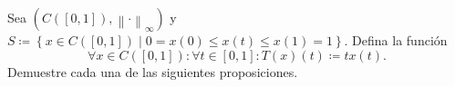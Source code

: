       Sea
      \begin{math}
        \left(
          C\left(\left[0,1\right]\right),
          {\left\|\cdot\right\|}_{\infty}
        \right)
      \end{math}
      y
      \begin{math}
        S\coloneqq
        \left\{x\in C\left(\left[0,1\right]\right)\mid
          0=x\left(0\right)\leq
          x\left(t\right)\leq
          x\left(1\right)=1
        \right\}
      \end{math}.
      Defina la función
      \begin{equation*}
        \forall x\in C\left(\left[0,1\right]\right):
        \forall t\in\left[0,1\right]:
        T\left(x\right)\left(t\right)\coloneqq
        tx\left(t\right).
      \end{equation*}
      Demuestre cada una de las siguientes proposiciones.
